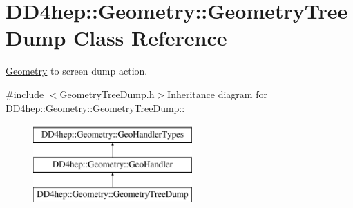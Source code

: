 \hypertarget{class_d_d4hep_1_1_geometry_1_1_geometry_tree_dump}{
\section{DD4hep::Geometry::GeometryTreeDump Class Reference}
\label{class_d_d4hep_1_1_geometry_1_1_geometry_tree_dump}
}


\hyperlink{namespace_d_d4hep_1_1_geometry}{Geometry} to screen dump action.  


{\ttfamily \#include $<$GeometryTreeDump.h$>$}Inheritance diagram for DD4hep::Geometry::GeometryTreeDump::\begin{figure}[H]
\begin{center}
\leavevmode
\includegraphics[height=3cm]{class_d_d4hep_1_1_geometry_1_1_geometry_tree_dump}
\end{center}
\end{figure}
